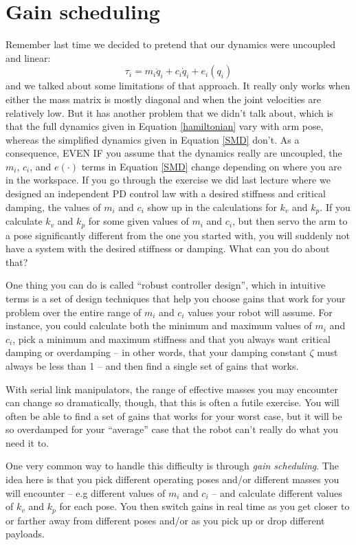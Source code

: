 \documentclass[]{article}
\begin{document}
\section{Gain scheduling}
Remember last time we decided to pretend that our dynamics were uncoupled and linear:
\begin{equation}
 \tau_{i} = m_{i}\ddot{q}_{i} + c_{i}\dot{q}_{i}+e_{i}(q_{i}) \label{SMD}
\end{equation}
and we talked about some limitations of that approach. It really only works when either the mass matrix is mostly diagonal and when the joint velocities are relatively low. But it has another problem that we didn't talk about, which is that the full dynamics given in Equation \ref{hamiltonian} vary with arm pose, whereas the simplified dynamics given in Equation \ref{SMD} don't. As a consequence, EVEN IF you assume that the dynamics really are uncoupled, the $m_{i}$, $c_{i}$, and $e(\cdot)$ terms in Equation \ref{SMD} change depending on where you are in the workspace. If you go through the exercise we did last lecture where we designed an independent PD control law with a desired stiffness and critical damping, the values of $m_{i}$ and $c_{i}$ show up in the calculations for $k_{v}$ and $k_{p}$. If you calculate $k_{v}$ and $k_{p}$ for some given values of $m_{i}$ and $c_{i}$, but then servo the arm to a pose significantly different from the one you started with, you will suddenly not have a system with the desired stiffness or damping. What can you do about that?

One thing you can do is called ``robust controller design'', which in intuitive terms is a set of design techniques that help you choose gains that work for your problem over the entire range of $m_{i}$ and $c_{i}$ values your robot will assume. For instance, you could calculate both the minimum and maximum values of $m_{i}$ and $c_{i}$, pick a minimum and maximum stiffness and that you always want critical damping or overdamping -- in other words, that your damping constant $\zeta$ must always be less than 1 -- and then find a single set of gains that works.

With serial link manipulators, the range of effective masses you may encounter can change so dramatically, though, that this is often a futile exercise. You will often be able to find a set of gains that works for your worst case, but it will be so overdamped for your ``average'' case that the robot can't really do what you need it to.

One very common way to handle this difficulty is through \textit{gain scheduling}. The idea here is that you pick different operating poses and/or different masses you will encounter -- e.g different values of $m_{i}$ and $c_{i}$ -- and calculate different values of $k_{v}$ and $k_{p}$ for each pose. You then switch gains in real time as you get closer to or farther away from different poses and/or as you pick up or drop different payloads.
\end{document}
